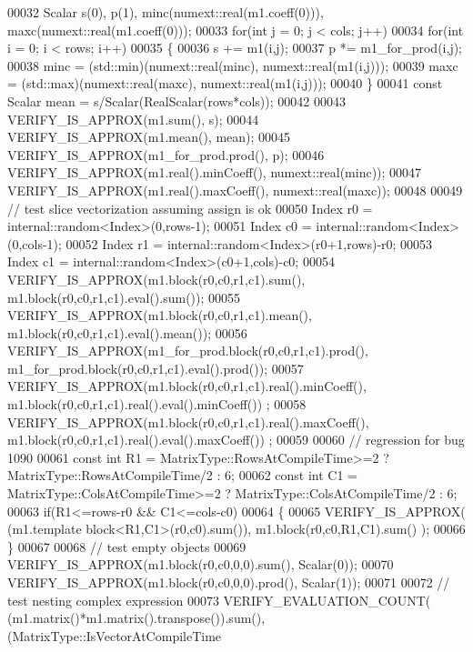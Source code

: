 \begin{DoxyCode}
00032   Scalar s(0), p(1), minc(numext::real(m1.coeff(0))), maxc(numext::real(m1.coeff(0)));
00033   \textcolor{keywordflow}{for}(\textcolor{keywordtype}{int} j = 0; j < cols; j++)
00034   \textcolor{keywordflow}{for}(\textcolor{keywordtype}{int} i = 0; i < rows; i++)
00035   \{
00036     s += m1(i,j);
00037     p *= m1\_for\_prod(i,j);
00038     minc = (std::min)(numext::real(minc), numext::real(m1(i,j)));
00039     maxc = (std::max)(numext::real(maxc), numext::real(m1(i,j)));
00040   \}
00041   \textcolor{keyword}{const} Scalar mean = s/Scalar(RealScalar(rows*cols));
00042 
00043   VERIFY\_IS\_APPROX(m1.sum(), s);
00044   VERIFY\_IS\_APPROX(m1.mean(), mean);
00045   VERIFY\_IS\_APPROX(m1\_for\_prod.prod(), p);
00046   VERIFY\_IS\_APPROX(m1.real().minCoeff(), numext::real(minc));
00047   VERIFY\_IS\_APPROX(m1.real().maxCoeff(), numext::real(maxc));
00048 
00049   \textcolor{comment}{// test slice vectorization assuming assign is ok}
00050   Index r0 = internal::random<Index>(0,rows-1);
00051   Index c0 = internal::random<Index>(0,cols-1);
00052   Index r1 = internal::random<Index>(r0+1,rows)-r0;
00053   Index c1 = internal::random<Index>(c0+1,cols)-c0;
00054   VERIFY\_IS\_APPROX(m1.block(r0,c0,r1,c1).sum(), m1.block(r0,c0,r1,c1).eval().sum());
00055   VERIFY\_IS\_APPROX(m1.block(r0,c0,r1,c1).mean(), m1.block(r0,c0,r1,c1).eval().mean());
00056   VERIFY\_IS\_APPROX(m1\_for\_prod.block(r0,c0,r1,c1).prod(), m1\_for\_prod.block(r0,c0,r1,c1).eval().prod());
00057   VERIFY\_IS\_APPROX(m1.block(r0,c0,r1,c1).real().minCoeff(), m1.block(r0,c0,r1,c1).real().eval().minCoeff())
      ;
00058   VERIFY\_IS\_APPROX(m1.block(r0,c0,r1,c1).real().maxCoeff(), m1.block(r0,c0,r1,c1).real().eval().maxCoeff())
      ;
00059 
00060   \textcolor{comment}{// regression for bug 1090}
00061   \textcolor{keyword}{const} \textcolor{keywordtype}{int} R1 = MatrixType::RowsAtCompileTime>=2 ? MatrixType::RowsAtCompileTime/2 : 6;
00062   \textcolor{keyword}{const} \textcolor{keywordtype}{int} C1 = MatrixType::ColsAtCompileTime>=2 ? MatrixType::ColsAtCompileTime/2 : 6;
00063   \textcolor{keywordflow}{if}(R1<=rows-r0 && C1<=cols-c0)
00064   \{
00065     VERIFY\_IS\_APPROX( (m1.template block<R1,C1>(r0,c0).sum()), m1.block(r0,c0,R1,C1).sum() );
00066   \}
00067   
00068   \textcolor{comment}{// test empty objects}
00069   VERIFY\_IS\_APPROX(m1.block(r0,c0,0,0).sum(),   Scalar(0));
00070   VERIFY\_IS\_APPROX(m1.block(r0,c0,0,0).prod(),  Scalar(1));
00071 
00072   \textcolor{comment}{// test nesting complex expression}
00073   VERIFY\_EVALUATION\_COUNT( (m1.matrix()*m1.matrix().transpose()).sum(), (MatrixType::IsVectorAtCompileTime 

\end{DoxyCode}
